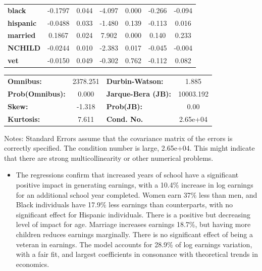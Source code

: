 \documentclass[
  letterpaper,
  DIV=11,
  numbers=noendperiod]{scrartcl}
\providecommand{\tightlist}{%
  \setlength{\itemsep}{0pt}\setlength{\parskip}{0pt}}\usepackage{longtable,booktabs,array}
\begin{document}
\begin{center}
\begin{tabular}{lcccccc}
\textbf{black}    &      -0.1797  &        0.044     &    -4.097  &         0.000        &       -0.266    &       -0.094     \\
\textbf{hispanic} &      -0.0488  &        0.033     &    -1.480  &         0.139        &       -0.113    &        0.016     \\
\textbf{married}  &       0.1867  &        0.024     &     7.902  &         0.000        &        0.140    &        0.233     \\
\textbf{NCHILD}   &      -0.0244  &        0.010     &    -2.383  &         0.017        &       -0.045    &       -0.004     \\
\textbf{vet}      &      -0.0150  &        0.049     &    -0.302  &         0.762        &       -0.112    &        0.082     \\
\bottomrule
\end{tabular}
\begin{tabular}{lclc}
\textbf{Omnibus:}       & 2378.251 & \textbf{  Durbin-Watson:     } &     1.885  \\
\textbf{Prob(Omnibus):} &   0.000  & \textbf{  Jarque-Bera (JB):  } & 10003.192  \\
\textbf{Skew:}          &  -1.318  & \textbf{  Prob(JB):          } &      0.00  \\
\textbf{Kurtosis:}      &   7.611  & \textbf{  Cond. No.          } &  2.65e+04  \\
\bottomrule
\end{tabular}
\end{center}

Notes: \newline
 [1] Standard Errors assume that the covariance matrix of the errors is correctly specified. \newline
 [2] The condition number is large, 2.65e+04. This might indicate that there are \newline
 strong multicollinearity or other numerical problems.

\begin{itemize}
\tightlist
\item
  The regressions confirm that increased years of school have a
  significant positive impact in generating earnings, with a 10.4\%
  increase in log earnings for an additional school year completed.
  Women earn 37\% less than men, and Black individuals have 17.9\% less
  earnings than counterparts, with no significant effect for Hispanic
  individuals. There is a positive but decreasing level of impact for
  age. Marriage increases earnings 18.7\%, but having more children
  reduces earnings marginally. There is no significant effect of being a
  veteran in earnings. The model accounts for 28.9\% of log earnings
  variation, with a fair fit, and largest coefficients in consonance
  with theoretical trends in economics.
\end{itemize}
\end{document}
